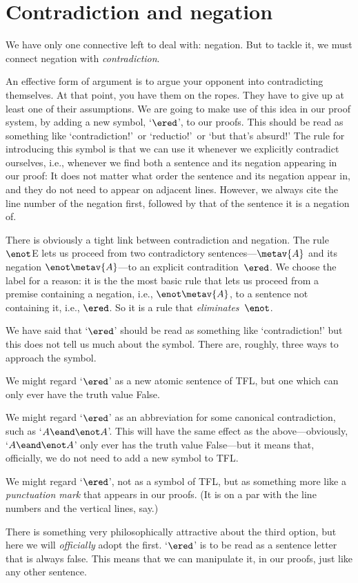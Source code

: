 \section{Contradiction and negation}

We have only one connective left to deal with: negation. But to tackle it, we must connect negation with \emph{contradiction}.

An effective form of argument is to argue your opponent into contradicting themselves. At that point, you have them on the ropes. They have to give up at least one of their assumptions. We are going to make use of this idea in our proof system, by adding a new symbol, `$\ered$', to our proofs. This should be read as something like `contradiction!'\ or `reductio!'\ or `but that's absurd!'  The rule for introducing this symbol is that we can use it whenever we explicitly contradict ourselves, i.e., whenever we find both a sentence and its negation appearing in our proof:
It does not matter what order the sentence and its negation appear in, and they do not need to appear on adjacent lines. However, we always cite the line number of the negation first, followed by that of the sentence it is a negation of.

There is obviously a tight link between contradiction and negation.
The rule $\enot$E lets us proceed from two contradictory sentences---$\metav{A}$ and its negation $\enot \metav{A}$---to an explicit contradition~$\ered$. We choose the label for a reason: it is the the most basic rule that lets us proceed from a premise containing a negation, i.e., $\enot\metav{A}$, to a sentence not containing it, i.e., $\ered$. So it is a rule that \emph{eliminates}~$\enot$.

We have said that `$\ered$' should be read as something like `contradiction!' but this does not tell us much about the symbol. There are, roughly, three ways to approach the symbol.
	\begin{ebullet}
		\item We might regard `$\ered$' as a new atomic sentence of TFL, but one which can only ever have the truth value False.
		\item We might regard `$\ered$' as an abbreviation for some canonical contradiction, such as `$A \eand \enot A$'. This will have the same effect as the above---obviously, `$A \eand \enot A$' only ever has the truth value False---but it means that, officially, we do not need to add a new symbol to TFL.
		\item We might regard `$\ered$', not as a symbol of TFL, but as something more like a \emph{punctuation mark} that appears in our proofs. (It is on a par with the line numbers and the vertical lines, say.)
	\end{ebullet}
There is something very philosophically attractive about the third option, but here we will \emph{officially} adopt the first. `$\ered$' is to be read as a sentence letter that is always false. This means that we can manipulate it, in our proofs, just like any other sentence.

